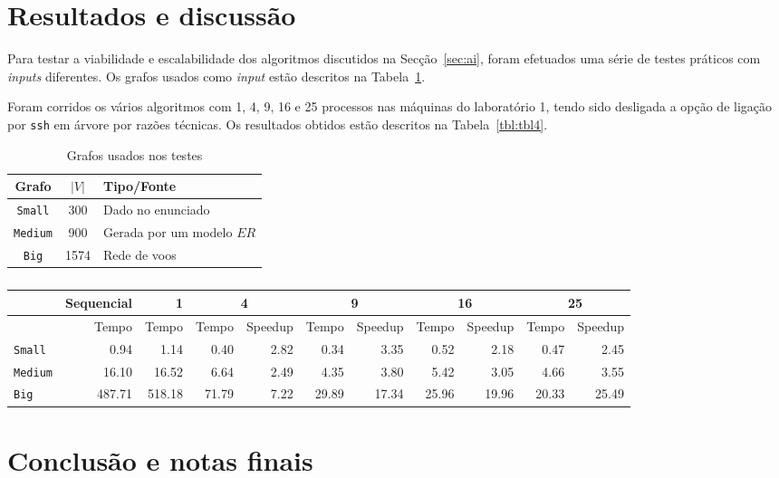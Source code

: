 \documentclass[10pt,a4paper,oneside]{article}
\begin{document}
\section{Resultados e discussão}
\label{sec:res}
Para testar a viabilidade e escalabilidade dos algoritmos discutidos
na Secção~\ref{sec:ai}, foram efetuados uma série de testes práticos
com \textit{inputs} diferentes. Os grafos usados como \textit{input}
estão descritos na Tabela~\ref{tbl:tbl3}.

Foram corridos os vários algoritmos com 1, 4, 9, 16 e 25 processos nas
máquinas do laboratório 1, tendo sido desligada a opção de ligação por
{\tt ssh} em árvore por razões técnicas. Os resultados obtidos estão
descritos na Tabela~\ref{tbl:tbl4}.

\begin{table}[t]
  \small
  \caption{Grafos usados nos testes}
  \label{tbl:tbl3}
  \centering
  \begin{tabular}{|c|c|l|}
    \hline
    Grafo & $|V|$ & Tipo/Fonte \\ \hline \hline
    {\tt Small}  &  300  & Dado no enunciado \\ \hline
    {\tt Medium} &  900  & Gerada por um modelo $ER$ \\ \hline
    {\tt Big}    &  1574 & Rede de voos \\ \hline
  \end{tabular}
\end{table}

\begin{table}[t]
  \caption{}
  \begin{tabular}{|l|r|r|r|r|r|r|r|r|r|r|}
    \hline
    & Sequencial & 1 & \multicolumn{2}{c|}{4} & \multicolumn{2}{c|}{9} & \multicolumn{2}{c|}{16} & \multicolumn{2}{c|}{25} \\ \hline
    & Tempo & Tempo & Tempo & Speedup & Tempo & Speedup & Tempo & Speedup & Tempo & Speedup \\ \hline
    {\tt Small} & 0.94 & 1.14 & 0.40 & 2.82 & 0.34 & 3.35 & 0.52 & 2.18 & 0.47 & 2.45 \\ \hline
    {\tt Medium} & 16.10 & 16.52 & 6.64 & 2.49 & 4.35 & 3.80 & 5.42 & 3.05 & 4.66 & 3.55 \\ \hline
    {\tt Big} & 487.71 & 518.18 & 71.79 & 7.22 & 29.89 & 17.34 & 25.96 & 19.96 & 20.33 & 25.49 \\ \hline
  \end{tabular}
  \label{}
\end{table}


\section{Conclusão e notas finais}
\label{sec:con}

\cite{shimbel1953structural}



\end{document}
